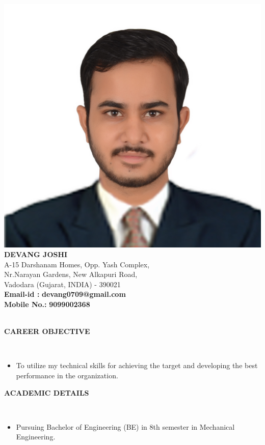 \documentclass[a4paper,10pt]{article}
\newcommand{\lsep}{-0.5cm}
\newcommand{\resheading}[1]{{\small \colorbox{mygrey}{\begin{minipage}{0.975\textwidth}{\textbf{#1 \vphantom{p\^{E}}}}\end{minipage}}}}
\begin{document}
\hspace{0.5cm}\\[-0.2cm]
\centering
\includegraphics[scale=.2]{photo.jpg}\\
\textbf{DEVANG JOSHI} \\   
\indent A-15 Darshanam Homes, Opp. Yash Complex, \\
\indent Nr.Narayan Gardens, New Alkapuri Road,\\
\indent Vadodara (Gujarat, INDIA) - 390021\\
\indent \textbf{Email-id :} \textbf{devang0709@gmail.com} \\
\indent \textbf{Mobile No.:} \textbf{9099002368} \\

\hspace{.2cm}\\
    \resheading {\textbf{\Large{{CAREER OBJECTIVE}}}}\\[\lsep]
\begin{itemize}
\item \noindent To utilize my technical skills for achieving the target and developing the best performance in the organization.
\end{itemize}

\resheading{\textbf{\Large{ACADEMIC DETAILS}} }\\
\begin{itemize}
\item \noindent Pursuing Bachelor of Engineering (BE) in 8th semester in Mechanical Engineering.
\end{itemize}
\end{document}
